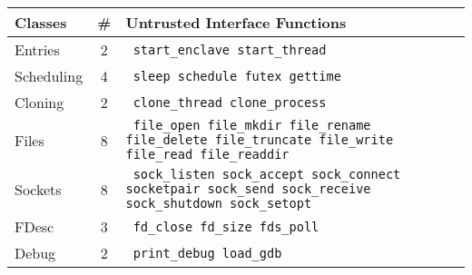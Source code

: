 \footnotesize
\begin{tabular}{lcl}
Classes & \# & Untrusted Interface Functions \\
\hline
Entries & 2 & {\tt
start\_enclave
start\_thread
} \\
\hline
Scheduling & 4 & {\tt
sleep
schedule
futex
gettime
} \\
\hline
Cloning & 2 & {\tt
clone\_thread
clone\_process
} \\
\hline
Files & 8 & \parbox[t][][t]{2.15in}{\tt
file\_open
file\_mkdir
file\_rename
file\_delete
file\_truncate
file\_write
file\_read
file\_readdir
\vspace{-0.1in}
} \\
\hline
Sockets & 8 & \parbox[t][][t]{2.15in}{\tt
sock\_listen
sock\_accept
sock\_connect
socketpair
sock\_send
sock\_receive
sock\_shutdown
sock\_setopt
} \\
\hline
FDesc & 3 & {\tt
fd\_close
fd\_size
fds\_poll
} \\
\hline
Debug & 2 & {\tt
print\_debug
load\_gdb
} \\
\hline
\end{tabular}
